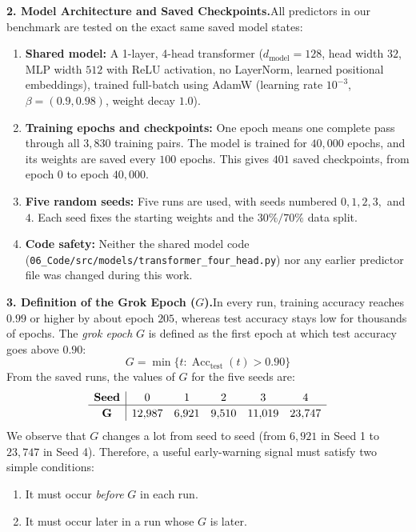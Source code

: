 \documentclass[11pt,a4paper,oneside]{report}
\begin{document}
\noindent\textbf{2. Model Architecture and Saved Checkpoints.}\quad All predictors in our benchmark are tested on the exact same saved model states:
\begin{enumerate}[label=\textbf{(\roman*)}]
\item \textbf{Shared model:} A 1-layer, 4-head transformer ($d_{\mathrm{model}} = 128$, head width $32$, MLP width $512$ with ReLU activation, no LayerNorm, learned positional embeddings), trained full-batch using AdamW (learning rate $10^{-3}$, $\beta = (0.9, 0.98)$, weight decay $1.0$).
\item \textbf{Training epochs and checkpoints:} One epoch means one complete pass through all $3{,}830$ training pairs. The model is trained for $40{,}000$ epochs, and its weights are saved every $100$ epochs. This gives $401$ saved checkpoints, from epoch $0$ to epoch $40{,}000$.
\item \textbf{Five random seeds:} Five runs are used, with seeds numbered $0, 1, 2, 3,$ and $4$. Each seed fixes the starting weights and the $30\% / 70\%$ data split.
\item \textbf{Code safety:} Neither the shared model code (\texttt{06\_Code/src/models/transformer\_four\_head.py}) nor any earlier predictor file was changed during this work.
\end{enumerate}

\noindent\textbf{3. Definition of the Grok Epoch ($G$).}\quad In every run, training accuracy reaches $0.99$ or higher by about epoch $205$, whereas test accuracy stays low for thousands of epochs. The \emph{grok epoch} $G$ is defined as the first epoch at which test accuracy goes above $0.90$:
\begin{equation}
\boxed{G = \min\bigl\{t : \operatorname{Acc}_{\mathrm{test}}(t) > 0.90\bigr\}}
\end{equation}
From the saved runs, the values of $G$ for the five seeds are:
\[
\begin{array}{c|ccccc}
\textbf{Seed} & 0 & 1 & 2 & 3 & 4\\ \hline
\rule{0pt}{2.4ex}\mathbf{G} & 12{,}987 & 6{,}921 & 9{,}510 & 11{,}019 & 23{,}747
\end{array}
\]
We observe that $G$ changes a lot from seed to seed (from $6{,}921$ in Seed 1 to $23{,}747$ in Seed 4). Therefore, a useful early-warning signal must satisfy two simple conditions:
\begin{enumerate}[label=\textbf{(\roman*)}]
\item It must occur \emph{before} $G$ in each run.
\item It must occur later in a run whose $G$ is later.
\end{enumerate}
\end{document}
